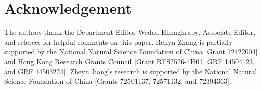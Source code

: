 \documentclass[nonblindrev,copyedit]{informs1}
\begin{document}
\section*{Acknowledgement}
The authors thank the Department Editor Wedad Elmaghraby, Associate Editor, and referees for helpful comments on this paper. Renyu Zhang is partially supported by the National Natural Science Foundation of China [Grant 72422004] and Hong Kong Research Grants Council [Grant RFS2526-4H01, GRF 14504123, and GRF 14503224]. Zheyu Jiang's research is supported by the National Natural Science Foundation of China [Grants 72501137, 72571132, and 72394363].

\begin{flushleft}


\end{flushleft}
\end{document}
